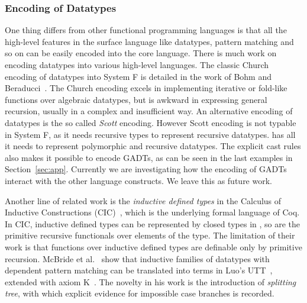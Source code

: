 \subsubsection{Encoding of Datatypes}

One thing \name differs from other functional programming languages is
that all the high-level features in the surface language like
datatypes, pattern matching and so on can be easily encoded into the
core language. There is much work on encoding datatypes into various
high-level languages. The classic Church encoding of datatypes into
System F is detailed in the work of Bohm and
Beraducci~\cite{Bohm1985}. The Church encoding excels in implementing
iterative or fold-like functions over algebraic datatypes, but is
awkward in expressing general recursion, usually in a complex and
insufficient way. An alternative encoding of datatypes is the so
called \emph{Scott} encoding. However Scott encoding is not typable in
System F, as it needs recursive types to represent recursive
datatypes. \name has all it needs to represent polymorphic and
recursive datatypes. The explicit cast rules also makes it possible to
encode GADTs, as can be seen in the last examples in
Section~\ref{sec:app}. Currently we are investigating how the encoding
of GADTs interact with the other language constructs. We leave this as
future work.

Another line of related work is the \emph{inductive defined types} in
the Calculus of Inductive Constructions (CIC)~\cite{cic}, which is the
underlying formal language of Coq. In CIC, inductive defined types can
be represented by closed types in \coc, so are the primitive recursive
functionals over elements of the type. The limitation of their work is
that functions over inductive defined types are definable only by
primitive recursion. McBride et al.~\cite{elim:pi:pattern} show that
inductive families of datatypes with dependent pattern matching can be
translated into terms in Luo's UTT~\cite{Luo:UTT}, extended with axiom
K~\cite{axiomK}. The novelty in his work is the introduction of
\emph{splitting tree}, with which explicit evidence for impossible
case branches is recorded.




